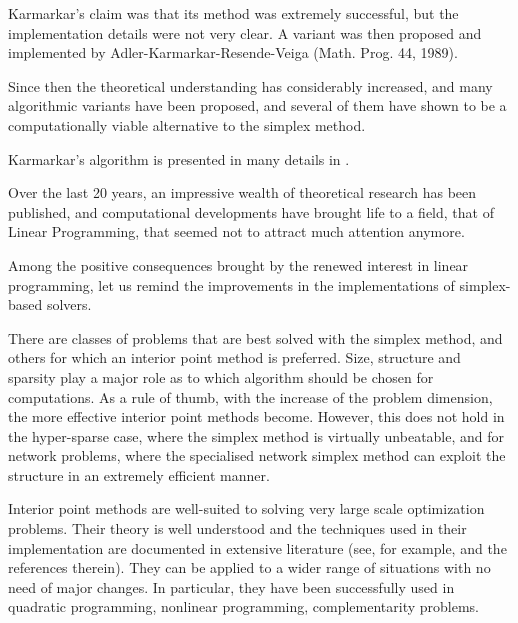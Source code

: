 
Karmarkar's claim was that its method was extremely successful, but
the implementation details were not very clear. A variant was then
proposed and implemented by Adler-Karmarkar-Resende-Veiga (Math. Prog.
44, 1989).

Since then the theoretical understanding has considerably increased,
and many algorithmic variants have been proposed, and several of
them have shown to be a computationally viable alternative to the
simplex method.

Karmarkar's algorithm is presented in many details in 
\cite[ch.6]{FangPuthenpura93}.

Over the last 20 years, an impressive wealth of theoretical research
has been published, and computational developments have brought life
to a field, that of Linear Programming, that seemed not to attract much
attention anymore.

Among the positive consequences brought by the renewed interest in linear
programming, let us remind the improvements in the implementations of 
simplex-based solvers.


There are classes of problems that are best solved with the simplex
method, and others for which an interior point method is preferred.
Size, structure and sparsity play a major role as to which
algorithm should be chosen for computations.
As a rule of thumb, with the increase of the problem dimension, the 
more effective interior point methods become.
However, this does not hold in the hyper-sparse case, where the
simplex method is virtually unbeatable, and for network problems,
where the specialised network simplex method can exploit the
structure in an extremely efficient manner.


Interior point methods are well-suited to solving very
large scale optimization problems. Their theory is well understood
\cite{ipm:Wright97} and the techniques used in their implementation 
are documented in extensive literature (see, for example, 
\cite{AndersenGondzioMeszarosXu,GondzioTerlaky} and the references therein).
They can be applied to a wider range of situations with no need
of major changes. In particular, they have been successfully used in
quadratic programming, nonlinear programming, complementarity problems.

